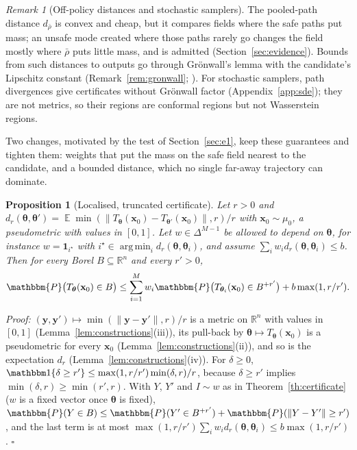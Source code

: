 \documentclass{article}
\DeclareMathOperator*{\argmin}{arg\,min}
\DeclareMathOperator{\E}{\mathbb{E}}
\newcommand{\RR}{\mathbb{R}}
\newcommand{\PP}{\mathbbm{P}}
\newcommand{\bth}{\boldsymbol{\theta}}
\newcommand{\bx}{\mathbf{x}}
\newcommand{\by}{\mathbf{y}}
\theoremstyle{plain}
\newtheorem{proposition}[theorem]{Proposition}
\theoremstyle{remark}
\newtheorem{remark}[theorem]{Remark}
\begin{document}
\begin{remark}[Off-policy distances and stochastic samplers]\label{rem:offpolicy}
The pooled-path distance $d_{\bar\rho}$ is convex and cheap, but it compares fields where the safe
paths put mass; an unsafe mode created where those paths rarely go changes the field mostly where
$\bar\rho$ puts little mass, and is admitted (Section~\ref{sec:evidence}). Bounds from such distances to
outputs go through Gr\"onwall's lemma with the candidate's Lipschitz constant
(Remark~\ref{rem:gronwall}; \citealt{benton2024error}). For stochastic samplers, path divergences give certificates without
Gr\"onwall factor (Appendix~\ref{app:sde}); they are not metrics, so their regions are conformal
regions but not Wasserstein regions.
\end{remark}

Two changes, motivated by the test of Section~\ref{sec:e1}, keep these guarantees and tighten them: weights
that put the mass on the safe field nearest to the candidate, and a bounded distance, which no single far-away trajectory
can dominate.

\begin{proposition}[Localised, truncated certificate]\label{pr:truncated}
Let $r>0$ and $d_r(\bth,\bth')=\E\min(\|T_{\bth}(\bx_0)-T_{\bth'}(\bx_0)\|,r)/r$ with $\bx_0\sim\mu_0$, a pseudometric with values in
$[0,1]$. Let $w\in\Delta^{M-1}$ be allowed to depend on $\bth$, for instance $w=\mathbf 1_{i^\star}$ with
$i^\star\in\argmin_id_r(\bth,\bth_i)$, and assume $\sum_iw_id_r(\bth,\bth_i)\le b$. Then for every Borel $B\subseteq\RR^n$ and
every $r'>0$,
\[
\PP\big(T_{\bth}(\bx_0)\in B\big)\le\sum_{i=1}^Mw_i\PP\big(T_{\bth_i}(\bx_0)\in B^{+r'}\big)+b\max(1,r/r').
\]
\end{proposition}
\textit{Proof:}
$(\by,\by')\mapsto\min(\|\by-\by'\|,r)/r$ is a metric on $\RR^n$ with values in $[0,1]$ (Lemma~\ref{lem:constructions}(iii)), its pull-back by
$\bth\mapsto T_{\bth}(\bx_0)$ is a pseudometric for every $\bx_0$ (Lemma~\ref{lem:constructions}(ii)), and so is the expectation $d_r$
(Lemma~\ref{lem:constructions}(iv)). For $\delta\ge0$,
$\mathbbm 1\{\delta\ge r'\}\le\max(1,r/r')\min(\delta,r)/r$, because $\delta\ge r'$ implies $\min(\delta,r)\ge\min(r',r)$. With $Y$, $Y'$ and $I\sim w$ as in Theorem~\ref{th:certificate} ($w$ is a fixed vector once
$\bth$ is fixed), $\PP(Y\in B)\le\PP(Y'\in B^{+r'})+\PP(\|Y-Y'\|\ge r')$, and the last term is at most
$\max(1,r/r')\sum_iw_id_r(\bth,\bth_i)\le b\max(1,r/r')$. \hfill$\square$
\end{document}
